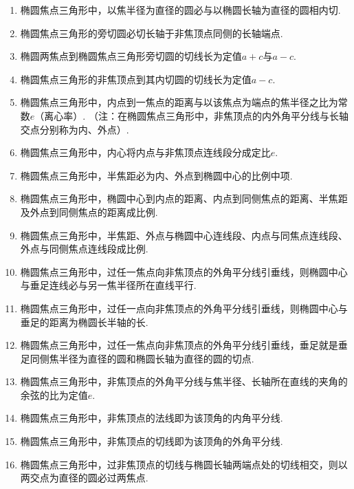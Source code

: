 \documentclass{article}
\begin{document}
\begin{enumerate}[label=\arabic*.]
\item 椭圆焦点三角形中，以焦半径为直径的圆必与以椭圆长轴为直径的圆相内切. 

\item 椭圆焦点三角形的旁切圆必切长轴于非焦顶点同侧的长轴端点. 

\item 椭圆两焦点到椭圆焦点三角形旁切圆的切线长为定值$a+c$与$a-c$. 

\item 椭圆焦点三角形的非焦顶点到其内切圆的切线长为定值$a-c$. 

\item 椭圆焦点三角形中，内点到一焦点的距离与以该焦点为端点的焦半径之比为常数$e$（离心率）. （注：在椭圆焦点三角形中，非焦顶点的内外角平分线与长轴交点分别称为内、外点）. 

\item 椭圆焦点三角形中，内心将内点与非焦顶点连线段分成定比$e$. 

\item 椭圆焦点三角形中，半焦距必为内、外点到椭圆中心的比例中项. 

\item 椭圆焦点三角形中，椭圆中心到内点的距离、内点到同侧焦点的距离、半焦距及外点到同侧焦点的距离成比例. 

\item 椭圆焦点三角形中，半焦距、外点与椭圆中心连线段、内点与同焦点连线段、外点与同侧焦点连线段成比例. 

\item 椭圆焦点三角形中，过任一焦点向非焦顶点的外角平分线引垂线，则椭圆中心与垂足连线必与另一焦半径所在直线平行. 

\item 椭圆焦点三角形中，过任一点向非焦顶点的外角平分线引垂线，则椭圆中心与垂足的距离为椭圆长半轴的长. 

\item 椭圆焦点三角形中，过任一焦点向非焦顶点的外角平分线引垂线，垂足就是垂足同侧焦半径为直径的圆和椭圆长轴为直径的圆的切点. 

\item 椭圆焦点三角形中，非焦顶点的外角平分线与焦半径、长轴所在直线的夹角的余弦的比为定值$e$. 

\item 椭圆焦点三角形中，非焦顶点的法线即为该顶角的内角平分线. 

\item 椭圆焦点三角形中，非焦顶点的切线即为该顶角的外角平分线. 

\item 椭圆焦点三角形中，过非焦顶点的切线与椭圆长轴两端点处的切线相交，则以两交点为直径的圆必过两焦点. 


\end{enumerate}
\end{document}
